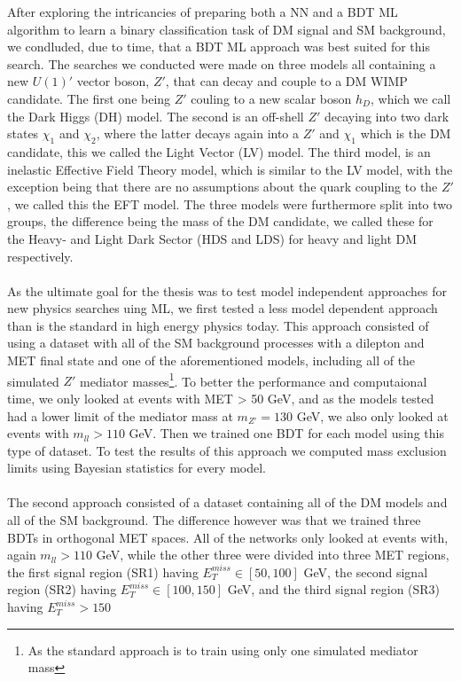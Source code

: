 \documentclass[12pt, a4paper]{book}
\begin{document}
After exploring the intricancies of preparing both a NN and a BDT ML algorithm to learn a binary classification task of DM signal and SM background, we condluded, due to time, that a BDT ML approach was 
best suited for this search. The searches we conducted were made on three models all containing a new $U(1)'$ vector boson, $Z'$, that can decay and couple to a DM WIMP candidate. The first one being $Z'$ couling to a new scalar boson $h_D$, 
which we call the Dark Higgs (DH) model. The second is an off-shell $Z'$ decaying into two dark states $\chi_1$ and $\chi_2$, where the latter decays again into a $Z'$ and $\chi_1$ which is the DM candidate, this we called the Light Vector (LV) model. 
The third model, is an inelastic Effective Field Theory model, which is similar to the LV model, with the exception being that there are no assumptions about the quark coupling to the $Z'$, we called this the EFT model. The three models were furthermore 
split into two groups, the difference being the mass of the DM candidate, we called these for the Heavy- and Light Dark Sector (HDS and LDS) for heavy and light DM respectively.\\
\\As the ultimate goal for the thesis was to test model independent approaches for new physics searches uing ML, we first tested a less model dependent approach than is the standard in high energy physics today. This approach consisted of using a dataset 
with all of the SM background processes with a dilepton and MET final state and one of the aforementioned models, including all of the simulated $Z'$ mediator masses\footnote{As the standard approach is to train using only one simulated mediator mass}. 
To better the performance and computaional time, we only looked at events with MET > 50 GeV, and as the models tested had a lower limit of the mediator mass at $m_{Z'}=130$ GeV, we also only looked at events with $m_{ll}>110$ GeV. Then we trained one BDT 
for each model using this type of dataset. To test the results of this approach we computed mass exclusion limits using Bayesian statistics for every model.\\
\\The second approach consisted of a dataset containing all of the DM models and all of the SM background. The difference however was that we trained three BDTs in orthogonal MET spaces. All of the networks only looked at events with, again $m_{ll}>110$ 
GeV, while the other three were divided into three MET regions, the first signal region (SR1) having $E_T^{miss}\in[50,100]$ GeV, the second signal region (SR2) having $E_T^{miss}\in[100,150]$ GeV, and the third signal region (SR3) having $E_T^{miss}>150$ 
\end{document}

